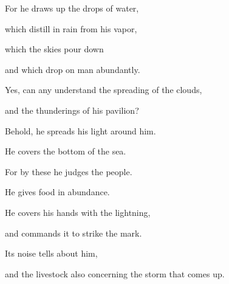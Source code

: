 {\par }{\Q {}For he draws up the drops of water,
\par }{\QB which distill in rain from his vapor,
\par }{\Q {}which the skies pour down
\par }{\QB and which drop on man abundantly.
\par }{\Q {}Yes, can any understand the spreading of the clouds,
\par }{\QB and the thunderings of his pavilion?
\par }{\Q {}Behold, he spreads his light around him.
\par }{\QB He covers the bottom of the sea.
\par }{\Q {}For by these he judges the people.
\par }{\QB He gives food in abundance.
\par }{\Q {}He covers his hands with the lightning,
\par }{\QB and commands it to strike the mark.
\par }{\Q {}Its noise tells about him,
\par }{\QB and the livestock also concerning the storm that comes up.
\par }{\BB \par }

